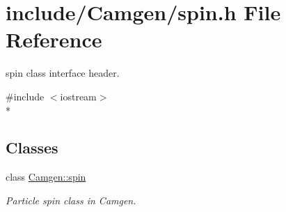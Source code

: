 \hypertarget{a00777}{}\section{include/\+Camgen/spin.h File Reference}
\label{a00777}


spin class interface header.  


{\ttfamily \#include $<$iostream$>$}\\*
\subsection*{Classes}
\begin{DoxyCompactItemize}
\item 
class \hyperlink{a00514}{Camgen\+::spin}
\begin{DoxyCompactList}\small\item\em Particle spin class in Camgen. \end{DoxyCompactList}\end{DoxyCompactItemize}
